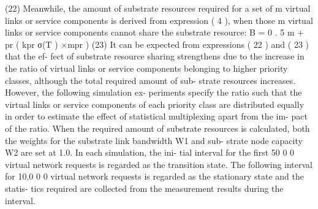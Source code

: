 (22) Meanwhile, the amount of substrate resources required for a set of m virtual links or service components is derived from expression ( 4 ), when those m virtual links or service components cannot share the substrate resource: B = 0 . 5 m +  pr ( kpr σ(T ) ×mpr ) (23) It can be expected from expressions ( 22 ) and ( 23 ) that the ef- fect of substrate resource sharing strengthens due to the increase in the ratio of virtual links or service components belonging to higher priority classes, although the total required amount of sub- strate resources increases. However, the following simulation ex- periments specify the ratio such that the virtual links or service components of each priority class are distributed equally in order to estimate the effect of statistical multiplexing apart from the im- pact of the ratio. When the required amount of substrate resources is calculated, both the weights for the substrate link bandwidth W1 and sub- strate node capacity W2 are set at 1.0. In each simulation, the ini- tial interval for the first 50 0 0 virtual network requests is regarded as the transition state. The following interval for 10,0 0 0 virtual network requests is regarded as the stationary state and the statis- tics required are collected from the measurement results during the interval.



